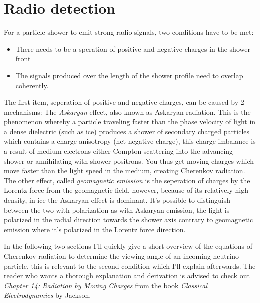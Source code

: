 \documentclass[11pt,a4paper,faculty=we,language=en,doctype=report]{cls/ugent-doc}
\begin{document}
\chapter{Radio detection}
For a particle shower to emit strong radio signals, two conditions have to be met:
\begin{itemize}
	\item There needs to be a speration of positive and negative charges in the shower front 
	\item The signals produced over the length of the shower profile need to overlap coherently.
\end{itemize}
The first item, seperation of positive and negative charges, can be caused by 2 mechanisms: The \textit{Askaryan} effect\cite{Askaryan}, also known as Askaryan radiation. This is the phenomenon whereby a particle traveling faster than the phase velocity of light in a dense dielectric (such as ice) produces a shower of secondary charged particles which contains a charge anisotropy (net negative charge), this charge imbalance is a result of medium electrons either Compton scattering into the advancing shower or annihilating with shower positrons. You thus get moving charges which move faster than the light speed in the medium, creating Cherenkov radiation.
The other effect, called \textit{geomagnetic emission} is the seperation of charges by the Lorentz force from the geomagnetic field, however, because of its relatively high density, in ice the Askaryan effect is dominant.
It's possible to distinguish between the two with polarization as with Askaryan emission, the light is polarized in the radial direction towards the shower axis contrary to geomagnetic emission where it's polarized in the Lorentz force direction.

In the following two sections I'll quickly give a short overview of the equations of Cherenkov radiation to determine the viewing angle of an incoming neutrino particle, this is relevant to the second condition which I'll explain afterwards. The reader who wants a thorough explanation and derivation is advised to check out \textit{Chapter 14: Radiation by Moving Charges} from the book \textit{Classical Electrodynamics} by Jackson. 
\end{document}
